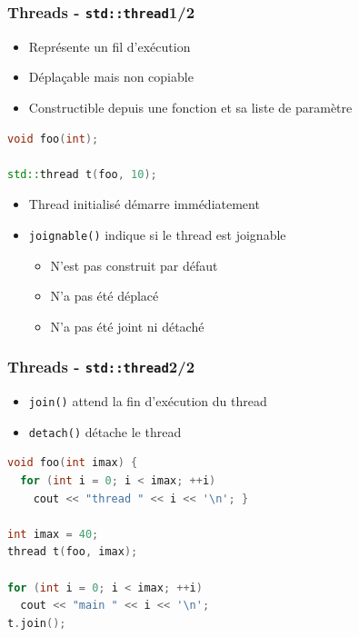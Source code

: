 \documentclass[C++.tex]{subfiles}
\begin{document}
\begin{frame}[fragile]
	\frametitle{Threads - \lstinline|std::thread|\titlehfill{}1/2}
	\begin{itemize}
		\item Représente un fil d'exécution
		\item Déplaçable mais non copiable
		\item Constructible depuis une fonction et sa liste de paramètre
	\end{itemize}

	\begin{lstlisting}[language=C++]
void foo(int);

std::thread t(foo, 10);\end{lstlisting}

	\begin{itemize}
		\item Thread initialisé démarre immédiatement
		\item \lstinline|joignable()| indique si le thread est joignable
		\begin{itemize}
			\item N'est pas construit par défaut
			\item N'a pas été déplacé
			\item N'a pas été joint ni détaché
		\end{itemize}
	\end{itemize}
\end{frame}

\begin{frame}[fragile]
	\frametitle{Threads - \lstinline|std::thread|\titlehfill{}2/2}
	\begin{itemize}
		\item \lstinline|join()| attend la fin d'exécution du thread
		\item \lstinline|detach()| détache le thread
	\end{itemize}

	\begin{lstlisting}[language=C++]
void foo(int imax) {
  for (int i = 0; i < imax; ++i)
    cout << "thread " << i << '\n'; }

int imax = 40;
thread t(foo, imax);

for (int i = 0; i < imax; ++i)
  cout << "main " << i << '\n';
t.join();\end{lstlisting}
\end{frame}
\end{document}
